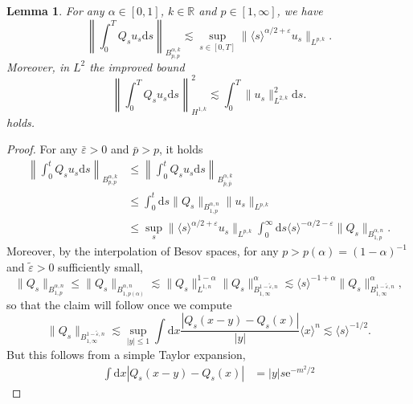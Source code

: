 \documentclass[11pt, a4paper]{scrartcl}
\numberwithin{equation}{section}
\theoremstyle{plain}
\newtheorem{lemma}[foo]{Lemma}
\theoremstyle{remark}
\newcommand{\mathd}{\mathrm{d}}
\newcommand{\mathe}{\mathrm{e}}
\newcommand{\nosymbol}{}
\begin{document}
\begin{lemma}
	\label{lem:I(u)-regularity}For any $\alpha \in [0, 1]$, $k \in \mathbb{R}$
	and $p \in [1, \infty]$, we have
	\begin{equation}
		\left\| \int_0^T Q_s u_s \mathd s \right\|_{B_{p, p}^{\alpha, k}} \lesssim
		\sup_{s \in [0, T]} \| \langle s \rangle^{\alpha / 2 + \varepsilon} u_s
		\|_{L^{p, k}} . \label{eq:Iu-Bp}
	\end{equation}
	Moreover, in $L^2$ the improved bound
	\begin{equation}
		\left\| \int_0^T Q_s u_s \mathd s_{\nosymbol} \right\|_{H^{1, k}}^2
		\lesssim \int_0^T \| u_s \|_{L^{2, k}}^2 \mathd s. \label{eq:Iu-H1}
	\end{equation}
	holds.
\end{lemma}

\begin{proof}
	For any $\bar{\varepsilon} > 0$ and $\bar{p} > p$, it holds
	\begin{align*}
		\left\| \int_0^t Q_s u_s \mathd s \right\|_{B_{p, p}^{\alpha, k}}
		 & \leqslant \left\| \int_0^t Q_s u_s \mathd s \right\|_{B_{\bar{p},
		\bar{p}}^{\alpha, k}}                                                \\
		 & \leqslant \int_0^t \mathd s \| Q_s \|_{B_{1,
		p}^{\alpha, n}} \| u_s \|_{L^{p, k}}                                 \\
		 & \leqslant \sup_s \| \langle s
		\rangle^{\alpha / 2 + \varepsilon} u_s \|_{L^{p, k}}  \int_0^{\infty}
		\mathd s \langle s \rangle^{- \alpha / 2 - \varepsilon} \| Q_s \|_{B_{1,
						p}^{\alpha, n}} .
	\end{align*}
	Moreover, by the interpolation of Besov spaces, for any $p > p (\alpha) = (1
		- \alpha)^{- 1}$ and $\tilde{\varepsilon} > 0$ sufficiently small,
	\[ \| Q_s \|_{B_{1, p}^{\alpha, n}} \leqslant \| Q_s \|_{B_{1, p
						(\alpha)}^{\alpha, n}} \lesssim \| Q_s \|_{L^{1, n}}^{1 - \alpha} \| Q_s
		\|^{\alpha}_{B_{1, \infty}^{1 - \tilde{\varepsilon}, n}} \lesssim \langle
		s \rangle^{- 1 + \alpha} \| Q_s \|_{B^{1 - \tilde{\varepsilon}, n}_{1,
						\infty}}^{\alpha}, \]
	so that the claim will follow once we compute
	\[ \| Q_s \|_{B^{1 - \tilde{\varepsilon}, n}_{1, \infty}} \lesssim \sup_{| y
			| \leqslant 1}  \int \mathd x \frac{| Q_s (x - y) - Q_s (x) |}{| y |}
		\langle x \rangle^n \lesssim \langle s \rangle^{- 1 / 2} . \]
	But this follows from a simple Taylor expansion,
	\[ \begin{aligned}
			\int \mathd x | Q_s (x - y) - Q_s (x) | & = | y | s \mathe^{- m^2 / 2
}
\end{aligned}\]
\end{proof}
\end{document}
